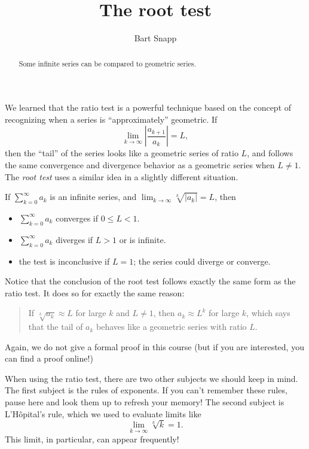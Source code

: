 \documentclass{ximera}
\author{Bart Snapp}
\title[Dig-In:]{The root test}
\begin{document}
\begin{abstract}
Some infinite series can be compared to geometric series.
\end{abstract}
\maketitle

We learned that the ratio test is a powerful technique based on the
concept of recognizing when a series is ``approximately'' geometric.
If
\[
\lim_{k \to \infty} \left|\frac{a_{k+1}}{a_k}\right| = L,
\]
then the ``tail'' of the series looks like a geometric series of ratio
$L$, and follows the same convergence and divergence behavior as a
geometric series when $L\neq 1$.  The \textit{root test} uses a similar idea in a
slightly different situation.
\begin{theorem}
  If $\sum_{k=0}^\infty a_k$ is an infinite series, and $\lim_{k \to \infty} \sqrt[k]{|a_k|} = L$, then 
  \begin{itemize}
  \item $\sum_{k=0}^\infty a_k$ converges if $0 \leq L < 1$.
  \item $\sum_{k=0}^\infty a_k$ diverges if $L>1$ or is infinite.
  \item the test is inconclusive if $L=1$; the series could diverge or converge.
  \end{itemize}
\end{theorem}
Notice that the conclusion of the root test follows exactly the same
form as the ratio test.  It does so for exactly the same reason:
\begin{quote}
  If $\sqrt[k]{a_k} \approx L$ for large $k$ and $L \neq 1$, then $a_k \approx L^k$
  for large $k$, which says that the tail of $a_k$ behaves like
  a geometric series with ratio $L$.
\end{quote}
Again, we do not give a formal proof in this course (but if you are
interested, you can find a proof online!)

When using the ratio test, there are two other subjects we should keep in mind. 
The first subject is the rules of exponents.  If you can't remember these rules, 
pause here and look them up to refresh your memory!  The second subject is 
L'H\^{o}pital's rule, which we used to evaluate limits like
\[
\lim_{k \to \infty} \sqrt[k]{k} = 1.
\]
This limit, in particular, can appear frequently!
\end{document}
